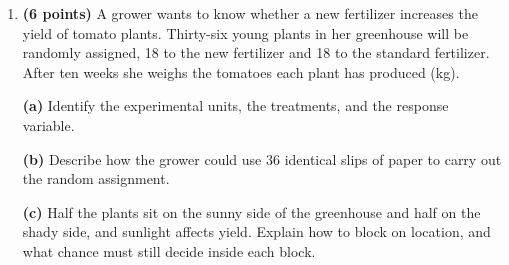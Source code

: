 \documentclass[12pt]{article}
\begin{document}
\begin{enumerate}[leftmargin=1.9em, itemsep=0.16in, resume]
  \boxguard[24]
  \item \textbf{(6 points)} A grower wants to know whether a new fertilizer increases the yield
        of tomato plants. Thirty-six young plants in her greenhouse will be randomly assigned,
        18 to the new fertilizer and 18 to the standard fertilizer. After ten weeks she weighs
        the tomatoes each plant has produced (kg).

        \vspace{6pt}
        \textbf{(a)} Identify the experimental units, the treatments, and the response
        variable.\\[4pt]

        \boxguard[14]
        \vspace{6pt}
        \textbf{(b)} Describe how the grower could use 36 identical slips of paper to carry out
        the random assignment.\\[4pt]

        \boxguard[15]
        \vspace{6pt}
        \textbf{(c)} Half the plants sit on the sunny side of the greenhouse and half on the shady
        side, and sunlight affects yield. Explain how to block on location, and what chance must
        still decide inside each block.\\[4pt]


\end{enumerate}
\end{document}
